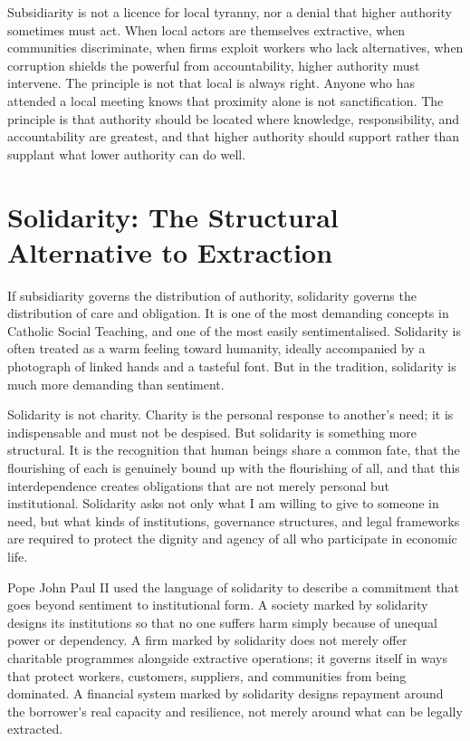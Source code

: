 \documentclass[11pt,a4paper,oneside]{book}
\begin{document}
Subsidiarity is not a licence for local tyranny, nor a denial that higher authority sometimes must act. When local actors are themselves extractive, when communities discriminate, when firms exploit workers who lack alternatives, when corruption shields the powerful from accountability, higher authority must intervene. The principle is not that local is always right. Anyone who has attended a local meeting knows that proximity alone is not sanctification. The principle is that authority should be located where knowledge, responsibility, and accountability are greatest, and that higher authority should support rather than supplant what lower authority can do well.

\section*{Solidarity: The Structural Alternative to Extraction}

If subsidiarity governs the distribution of authority, solidarity governs the distribution of care and obligation. It is one of the most demanding concepts in Catholic Social Teaching, and one of the most easily sentimentalised. Solidarity is often treated as a warm feeling toward humanity, ideally accompanied by a photograph of linked hands and a tasteful font. But in the tradition, solidarity is much more demanding than sentiment.

Solidarity is not charity. Charity is the personal response to another's need; it is indispensable and must not be despised. But solidarity is something more structural. It is the recognition that human beings share a common fate, that the flourishing of each is genuinely bound up with the flourishing of all, and that this interdependence creates obligations that are not merely personal but institutional. Solidarity asks not only what I am willing to give to someone in need, but what kinds of institutions, governance structures, and legal frameworks are required to protect the dignity and agency of all who participate in economic life.

Pope John Paul II used the language of solidarity to describe a commitment that goes beyond sentiment to institutional form. A society marked by solidarity designs its institutions so that no one suffers harm simply because of unequal power or dependency. A firm marked by solidarity does not merely offer charitable programmes alongside extractive operations; it governs itself in ways that protect workers, customers, suppliers, and communities from being dominated. A financial system marked by solidarity designs repayment around the borrower's real capacity and resilience, not merely around what can be legally extracted.
\end{document}
